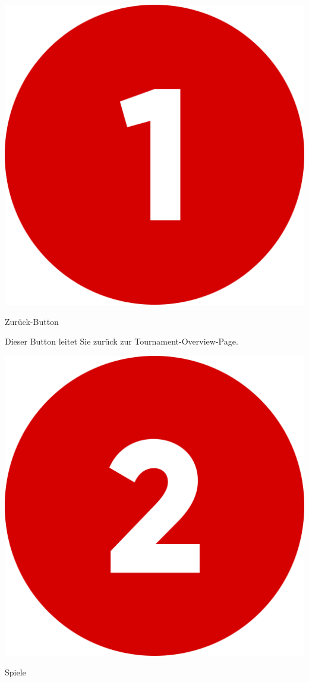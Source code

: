 \bigskip
\includegraphics[scale=0.05]{pics/user-guide/numbers/number-1.png} \begin{LARGE} Zurück-Button \end{LARGE}

Dieser Button leitet Sie zurück zur Tournament-Overview-Page.

\bigskip
\includegraphics[scale=0.05]{pics/user-guide/numbers/number-2.png} \begin{LARGE} Spiele \end{LARGE}

